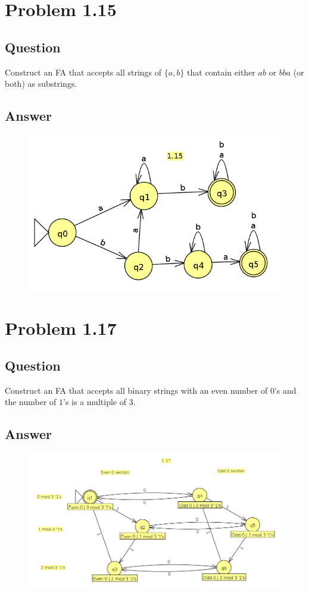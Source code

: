 \documentclass[12pt, a4paper]{article}
\begin{document}
\section{Problem 1.15}
\subsection{Question}
Construct an FA that accepts all strings of $\{a, b\}$ that contain either $ab$ or $bba$ (or both) as substrings.
\subsection{Answer}
\begin{figure}[H]
\includegraphics[scale=0.3]{1.15}
\end{figure}

\section{Problem 1.17}
\subsection{Question}
Construct an FA that accepts all binary strings with an even number of $0$'s and the number of $1$'s is a multiple of 3.
\subsection{Answer}
\begin{figure}[H]
\includegraphics[scale=0.3]{1.17}
\end{figure}
\end{document}
